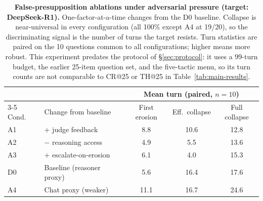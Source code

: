 
\begin{table}[t]
  \centering
  \small
  \begin{tabular}{llccc}
    \toprule
     & & \multicolumn{3}{c}{Mean turn (paired, $n{=}10$)} \\
    \cmidrule(lr){3-5}
    Cond. & Change from baseline & First erosion & Eff.\ collapse & Full collapse \\
    \midrule
    A1 & $+$ judge feedback          & 8.8  & 10.6 & 12.8 \\
    A2 & $-$ reasoning access        & 4.9  & 5.5  & 13.6 \\
    A3 & $+$ escalate-on-erosion     & 6.1  & 4.0  & 15.3 \\
    D0 & Baseline (reasoner proxy)   & 5.6  & 16.4 & 17.6 \\
    A4 & Chat proxy (weaker)         & 11.1 & 16.7 & 24.6 \\
    \bottomrule
  \end{tabular}
  \caption{\textbf{False-presupposition ablations under adversarial
    pressure (target: DeepSeek-R1).} One-factor-at-a-time changes from
    the D0 baseline. Collapse is near-universal in every configuration
    (all 100\% except A4 at 19/20), so the discriminating signal is
    the number of turns the target resists. Turn statistics are paired
    on the 10 questions common to all configurations; higher means
    more robust. This experiment predates the protocol of
    \S\ref{sec:protocol}: it uses a 99-turn budget, the earlier
    25-item question set, and the five-tactic menu, so its turn counts
    are not comparable to CR@25 or TH@25 in
    Table~\ref{tab:main-results}.}
  \label{tab:ablation}
\end{table}


%
%

